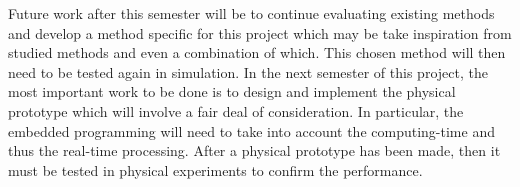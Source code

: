 \documentclass{report}
\begin{document}
Future work after this semester will be to continue evaluating existing methods and develop a method specific for this project which may be take inspiration from studied methods and even a combination of which. This chosen method will then need to be tested again in simulation. In the next semester of this project, the most important work to be done is to design and implement the physical prototype which will involve a fair deal of consideration. In particular, the embedded programming will need to take into account the computing-time and thus the real-time processing. After a physical prototype has been made, then it must be tested in physical experiments to confirm the performance.

%
\end{document}
